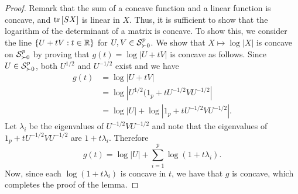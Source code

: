 \begin{proof}
    Remark that the sum of a concave function and a linear function is concave, and $\trB{SX}$ is linear in $X$. Thus, it is sufficient to show that the logarithm of the determinant of a matrix is concave. To show this, we consider the line $\eset{ U + tV : t \in \R }$ for $U, V \in \S^p_{\succ 0}$. We show that $X \mapsto \log |X|$ is concave on $\S^p_{\succ 0}$ by proving that $g(t) = \log |U + tV|$ is concave as follows. Since $U \in \S^p_{\succ 0}$, both $U^{1/2}$ and $U^{-1/2}$ exist and we have 
    \begin{align*}
        g(t)
        &= \log |U + tV| \\
        &= \log |U^{1/2}(1_p + tU^{-1/2}VU^{-1/2}|\\
        &= \log |U| + \log |1_p + tU^{-1/2}VU^{-1/2}|.
    \end{align*}
    Let $\lambda_i$ be the eigenvalues of $U^{-1/2}VU^{-1/2}$ and note that the eigenvalues of $1_p + tU^{-1/2}VU^{-1/2}$ are $1 + t\lambda_i$. Therefore
    \begin{equation*}
        g(t) = \log |U| + \sum_{i=1}^p \log (1 + t\lambda_i).
    \end{equation*}
    Now, since each $\log (1 + t\lambda_i)$ is concave in $t$, we have that $g$ is concave, which completes the proof of the lemma.
\end{proof}


